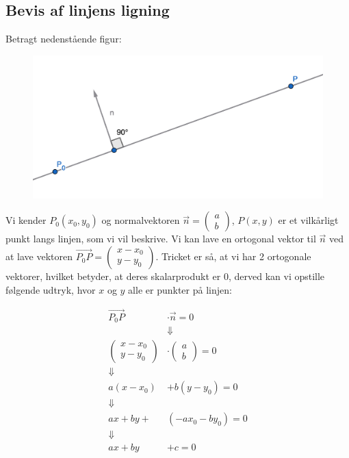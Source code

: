 \documentclass{article}
\makeatletter
\newenvironment{proofw}{\par
  \pushQED{\qed}%
  \normalfont \topsep6\p@\@plus6\p@\relax
  \trivlist
  \item[]\ignorespaces
}{%
  \popQED\endtrivlist\@endpefalse
}
\makeatother
\begin{document}
\subsection{Bevis af linjens ligning}

\begin{proofw}
    Betragt nedenstående figur:
    \begin{figure}[h]
        \centering
        \includegraphics[scale=0.4]{skitser/linjens_ligning.png}
    \end{figure}

    Vi kender $P_0(x_0,y_0)$ og normalvektoren $\vec{n}=\begin{pmatrix}
        a \\ b
    \end{pmatrix}$, $P(x,y)$ er et vilkårligt punkt langs linjen, som vi vil beskrive.
    Vi kan lave en ortogonal vektor til $\vec{n}$ ved at lave vektoren $\vec{P_0P}=\begin{pmatrix}
        x-x_0
        \\
        y-y_0
    \end{pmatrix}$.
    Tricket er så, at vi har 2 ortogonale vektorer, hvilket betyder,
    at deres skalarprodukt er 0, derved kan vi opstille følgende udtryk, hvor $x$ og $y$ alle er punkter på linjen:

    \begin{align*}
        \vec{P_0P}&\cdot\vec{n}=0
        \\
        &\Downarrow
        \\
        \begin{pmatrix}
            x-x_0
            \\
            y-y_0
        \end{pmatrix}
        &\cdot
        \begin{pmatrix}
            a \\
            b
        \end{pmatrix}=0
        \\
        \Downarrow
        \\
        a(x-x_0)&+b(y-y_0)=0
        \\
        \Downarrow
        \\
        ax+by+&(-ax_0-by_0)=0
        \\
        \Downarrow
        \\
        ax+by&+c=0
    \end{align*}


\end{proofw}
\end{document}
